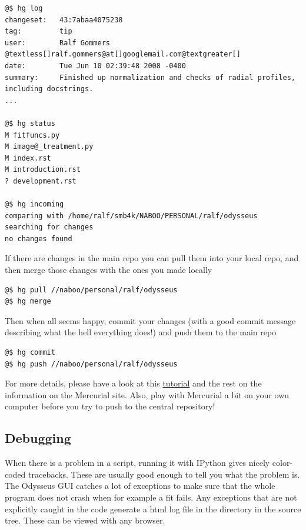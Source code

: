 \documentclass[letterpaper,10pt,english]{manual}
\begin{document}
\begin{Verbatim}[commandchars=@\[\]]
@$ hg log
changeset:   43:7abaa4075238
tag:         tip
user:        Ralf Gommers @textless[]ralf.gommers@at[]googlemail.com@textgreater[]
date:        Tue Jun 10 02:39:48 2008 -0400
summary:     Finished up normalization and checks of radial profiles, including docstrings.
...

@$ hg status
M fitfuncs.py
M image@_treatment.py
M index.rst
M introduction.rst
? development.rst

@$ hg incoming
comparing with /home/ralf/smb4k/NABOO/PERSONAL/ralf/odysseus
searching for changes
no changes found
\end{Verbatim}

If there are changes in the main repo you can pull them into your local repo, and then merge those changes with the ones you made locally

\begin{Verbatim}[commandchars=@\[\]]
@$ hg pull //naboo/personal/ralf/odysseus
@$ hg merge
\end{Verbatim}

Then when all seems happy, commit your changes (with a good commit message describing what the hell everything does!) and push them to the main repo

\begin{Verbatim}[commandchars=@\[\]]
@$ hg commit
@$ hg push //naboo/personal/ralf/odysseus
\end{Verbatim}

For more details, please have a look at this \href{http://www.selenic.com/mercurial/wiki/index.cgi/Tutorial}{tutorial} and the rest on the information on the Mercurial site. Also, play with Mercurial a bit on your own computer before you try to push to the central repository!


\subsection{Debugging}

When there is a problem in a script, running it with IPython gives nicely color-coded tracebacks. These are usually good enough to tell you what the problem is. The Odysseus GUI catches a lot of exceptions to make sure that the whole program does not crash when for example a fit fails. Any exceptions that are not explicitly caught in the code generate a html log file in the directory  in the source tree. These can be viewed with any browser.
\end{document}
